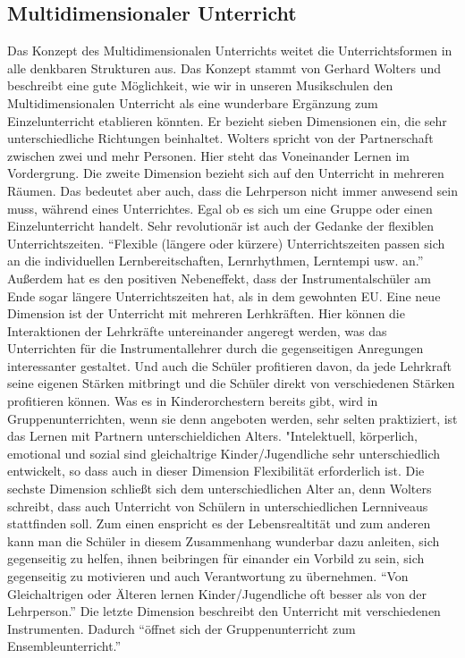 



\subsection{Multidimensionaler Unterricht} 
Das Konzept des Multidimensionalen Unterrichts weitet die Unterrichtsformen in
alle denkbaren Strukturen aus. Das Konzept stammt von Gerhard Wolters und
beschreibt eine gute Möglichkeit, wie wir in unseren Musikschulen den
Multidimensionalen Unterricht als eine wunderbare Ergänzung zum Einzelunterricht
etablieren könnten. Er bezieht sieben Dimensionen ein, die sehr unterschiedliche
Richtungen beinhaltet. \autocite[86ff]{ernst:die_zukunftsfaehige_musikschule}
Wolters spricht von
der Partnerschaft zwischen zwei und mehr Personen. Hier steht das Voneinander
Lernen im Vordergrung. Die zweite Dimension bezieht sich auf den Unterricht in
mehreren Räumen. Das bedeutet aber auch, dass die Lehrperson nicht immer
anwesend sein muss, während eines Unterrichtes. Egal ob es sich um eine Gruppe
oder einen Einzelunterricht handelt. Sehr revolutionär ist auch der Gedanke der
flexiblen Unterrichtszeiten. \enquote{Flexible (längere oder kürzere) Unterrichtszeiten
passen sich an die individuellen Lernbereitschaften, Lernrhythmen, Lerntempi
usw. an.} \autocite[87]{ernst:die_zukunftsfaehige_musikschule} Außerdem hat es
den positiven Nebeneffekt, dass der Instrumentalschüler am Ende sogar längere
Unterrichtszeiten hat, als in dem gewohnten EU. Eine neue Dimension ist der
Unterricht mit mehreren Lerhkräften. Hier können die Interaktionen der
Lehrkräfte untereinander angeregt werden, was das Unterrichten für die
Instrumentallehrer durch die gegenseitigen Anregungen interessanter gestaltet.
Und auch die Schüler profitieren davon, da jede Lehrkraft seine eigenen Stärken
mitbringt und die Schüler direkt von verschiedenen Stärken profitieren können.
Was es in Kinderorchestern bereits gibt, wird in Gruppenunterrichten, wenn sie
denn angeboten werden, sehr selten praktiziert, ist das Lernen mit Partnern
unterschieldichen Alters. "Intelektuell, körperlich, emotional und sozial sind
gleichaltrige Kinder/Jugendliche sehr unterschiedlich entwickelt, so dass auch
in dieser Dimension Flexibilität erforderlich ist.
\autocite[87]{ernst:die_zukunftsfaehige_musikschule} Die sechste Dimension
schließt sich dem unterschiedlichen Alter an, denn Wolters schreibt, dass auch
Unterricht von Schülern in unterschiedlichen Lernniveaus stattfinden soll. Zum
einen enspricht es der Lebensrealtität und zum anderen kann man die Schüler in
diesem Zusammenhang wunderbar dazu anleiten, sich gegenseitig zu helfen, ihnen
beibringen für einander ein Vorbild zu sein, sich gegenseitig zu motivieren und
auch Verantwortung zu übernehmen. \enquote{Von Gleichaltrigen oder Älteren lernen
Kinder/Jugendliche oft besser als von der Lehrperson.}
\autocite[87]{ernst:die_zukunftsfaehige_musikschule} Die letzte Dimension
beschreibt den Unterricht mit verschiedenen Instrumenten. Dadurch \enquote{öffnet sich
der Gruppenunterricht zum Ensembleunterricht.}
\autocite[87]{ernst:die_zukunftsfaehige_musikschule}
